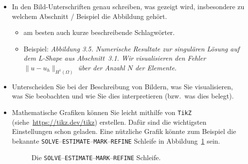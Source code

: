 \begin{itemize}
  \item In den Bild-Unterschriften genau schreiben, was gezeigt wird, insbesondere zu welchem Abschnitt / Beispiel die Abbildung gehört.
        \begin{itemize}
          \item am besten auch kurze beschreibende Schlagwörter.
          \item Beispiel: \emph{Abbildung 3.5. Numerische Resultate zur singulären Lösung auf dem L-Shape aus  Abschnitt~3.1. Wir visualisieren den Fehler $\|u-u_h\|_{H^1(\Omega)}$ über der Anzahl $N$ der Elemente.}
        \end{itemize}

  \item Unterscheiden Sie bei der Beschreibung von Bildern, was Sie visualisieren, was Sie beobachten und wie Sie dies interpretieren (bzw.\ was dies belegt).

  \item Mathematische Grafiken können Sie leicht mithilfe von \verb$TikZ$ (siehe~\url{https://tikz.dev/tikz}) erstellen. Dafür sind die wichtigsten Einstellungen schon geladen. Eine nützliche Grafik könnte zum Beispiel die bekannte \texttt{SOLVE}--\texttt{ESTIMATE}--\texttt{MARK}--\texttt{REFINE} Schleife in Abbildung~\ref{fig:afem} sein.
        \begin{figure}
          \centering
          \caption{Die \texttt{SOLVE}--\texttt{ESTIMATE}--\texttt{MARK}--\texttt{REFINE} Schleife.\label{fig:afem}}
        \end{figure}


\end{itemize}
